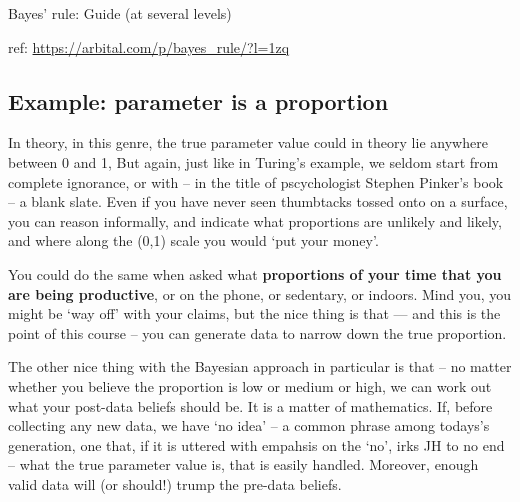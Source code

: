 \documentclass[]{book}
\begin{document}
Bayes' rule: Guide (at several levels)

ref: \url{https://arbital.com/p/bayes_rule/?l=1zq}

\hypertarget{example-parameter-is-a-proportion}{%
\subsection{Example: parameter is a proportion}\label{example-parameter-is-a-proportion}}

In theory, in this genre, the true parameter value could in theory lie anywhere between 0 and 1, But again, just like in Turing's example, we seldom start from complete ignorance, or with -- in the title of pscychologist Stephen Pinker's book -- a blank slate. Even if you have never seen thumbtacks tossed onto on a surface, you can reason informally, and indicate what proportions are unlikely and likely, and where along the (0,1) scale you would `put your money'.

You could do the same when asked what \textbf{proportions of your time that you are being productive}, or on the phone, or sedentary, or indoors. Mind you, you might be `way off' with your claims, but the nice thing is that --- and this is the point of this course -- you can generate data to narrow down the true proportion.

The other nice thing with the Bayesian approach in particular is that -- no matter whether you believe the proportion is low or medium or high, we can work out what your post-data beliefs should be. It is a matter of mathematics. If, before collecting any new data, we have `no idea' -- a common phrase among todays's generation, one that, if it is uttered with empahsis on the `no', irks JH to no end -- what the true parameter value is, that is easily handled. Moreover, enough valid data will (or should!) trump the pre-data beliefs.
\end{document}
